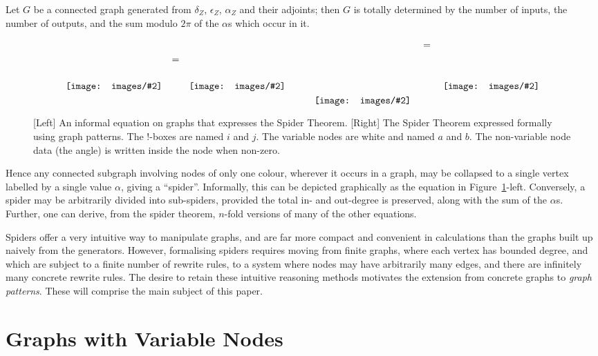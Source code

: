 \documentclass[runningheads]{llncs}
\newcommand{\inlinegraphic}[2]{
  \dimendef\grafheight=255\dimendef\grafvshift=254
  \grafheight=#1
  \grafvshift=-0.5\grafheight
  \advance\grafvshift by 0.5ex
  \raisebox{\grafvshift}{\texttt{[image: images/\#2]}\xspace}
}
\begin{document}
\begin{theorem}
  Let $G$ be a connected graph generated
  from $\delta_Z$, $\epsilon_Z$, $\alpha_Z$ and their adjoints; then
  $G$ is totally determined by the number of inputs, the number of
  outputs, and the sum modulo $2\pi$ of the $\alpha$s which occur in
  it.
\end{theorem}

\begin{figure}[t]
$$\begin{array}{ccc}
\inlinegraphic{6em}{spider_lhs} & = & \inlinegraphic{6em}{spider_rhs}
\end{array}\qquad
\begin{array}{ccc}
\inlinegraphic{12em}{spider_lhs_patt} & \;=\; & \inlinegraphic{9em}{spider_rhs_patt}
\end{array}$$
\label{fig:spider}\caption{ [Left] An informal equation on graphs that
  expresses the Spider Theorem.  [Right] The Spider Theorem expressed
  formally using graph patterns.  The !-boxes are named $i$ and $j$.
  The variable nodes are white and named $a$ and $b$. The non-variable
  node data (the angle) is written inside the node when non-zero.}

\end{figure}

Hence any connected subgraph involving nodes of only one colour,
wherever it occurs in a graph, may be collapsed to a single vertex
labelled by a single value $\alpha$, giving a ``spider''. Informally,
this can be depicted graphically as the equation in
Figure~\ref{fig:spider}-left. Conversely, a spider may be
arbitrarily divided into sub-spiders, provided the total in- and
out-degree is preserved, along with the sum of the $\alpha$s.
Further, one can derive, from the spider theorem, $n$-fold versions of
many of the other equations.

Spiders offer a very intuitive way to manipulate graphs, and are far
more compact and convenient in calculations than the graphs built up
naively from the generators.  However, formalising spiders requires
moving from finite graphs, where each vertex has bounded degree, and
which are subject to a finite number of rewrite rules, to a system
where nodes may have arbitrarily many edges, and there are infinitely
many concrete rewrite rules. The desire to retain these intuitive
reasoning methods motivates the extension from concrete graphs to
\emph{graph patterns}. These will comprise the main subject of this
paper.

\section{Graphs with Variable Nodes}
\end{document}

